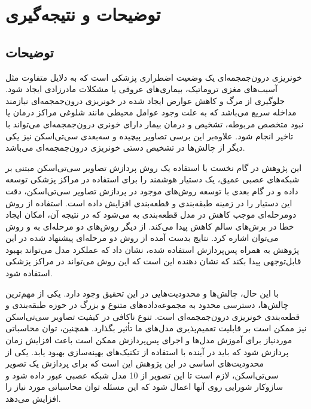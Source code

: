 \chapter{توضیحات و نتیجه‌گیری}
\section{توضیحات}
خونریزی درون‌جمجمه‌ای یک وضعیت اضطراری پزشکی است که به دلایل متفاوت مثل آسیب‌های مغزی تروماتیک، بیماری‌های عروقی یا مشکلات مادرزادی ایجاد شود\cite{monica2022detection}.
جلوگیری از مرگ و کاهش عوارض ایجاد شده در خونریزی درون‌جمجمه‌ای نیازمند مداخله سریع می‌باشد که به علت وجود عوامل محیطی مانند شلوغی مراکز درمان یا نبود متخصص مربوطه، تشخیص و درمان بیمار دارای خونری درون‌جمجمه‌ای می‌تواند با تاخیر انجام شود. علاوه‌بر این برسی تصاویر پیچیده و سه‌بعدی سی‌تی‌اسکن نیز یکی دیگر از چالش‌ها در تشخیص دستی خونریزی درون‌جمجمه‌ای می‌باشد.

این پژوهش در گام نخست با استفاده یک روش پردازش تصاویر سی‌تی‌اسکن مبتنی بر شبکه‌های عصبی عمیق،‌ یک دستیار هوشمند را برای استفاده در مراکز پزشکی توسعه داده و در گام بعدی با توسعه روش‌های موجود در پردازش تصاویر سی‌تی‌اسکن، دقت این دستیار را در زمینه طبقه‌بندی و قطعه‌بندی افزایش داده است.
استفاده از روش دومرحله‌ای موجب کاهش
در مدل قطعه‌بندی به 
می‌شود که در نتیجه آن، امکان ایجاد خطا در برش‌‌های سالم کاهش پیدا می‌کند. از دیگر روش‌های دو مرحله‌ای به 
و روش
می‌توان اشاره کرد.
 نتایج بدست آمده از روش دو مرحله‌ای پیشنهاد شده در این پژوهش به همراه پس‌پردازش استفاده شده،‌ نشان داد که عملکرد مدل می‌تواند بهبود قابل‌توجهی پیدا بکند که نشان دهنده این است که این روش می‌تواند در مراکز پزشکی استفاده شود.

با این حال، چالش‌ها و محدودیت‌هایی در این تحقیق وجود دارد. یکی از مهم‌ترین چالش‌ها، دسترسی محدود به مجموعه‌داده‌های متنوع و بزرگ در حوزه طبقه‌بندی و قطعه‌بندی خونریزی درون‌جمجمه‌ای است. تنوع ناکافی در کیفیت تصاویر سی‌تی‌اسکن نیز ممکن است بر قابلیت تعمیم‌پذیری مدل‌های ما تأثیر بگذارد. همچنین، توان محاسباتی موردنیاز برای آموزش مدل‌ها و اجرای پس‌پردازش ممکن است باعث افزایش زمان پردازش شود که باید در آینده با استفاده از تکنیک‌های بهینه‌سازی بهبود یابد.
یکی از محدودیت‌های اساسی در این پژوهش این است که برای پردازش یک تصویر سی‌تی‌اسکن،‌ لازم است تا این تصویر از 10 مدل شبکه عصبی عبور داده شود و سازوکار شورایی روی آنها اعمال شود که این مسئله توان محاسباتی مورد نیاز را افزایش می‌دهد.

